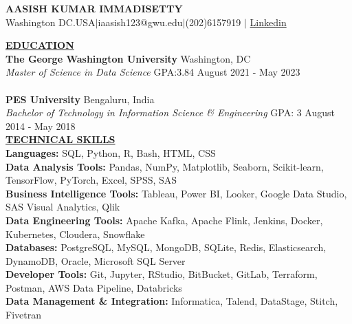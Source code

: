 \documentclass{article}
\begin{document}
\begin{center}
\thispagestyle{empty}
\large \textbf{AASISH KUMAR IMMADISETTY \\}
\normalsize Washington DC.USA$\mid$iaasish123@gwu.edu$\mid$(202)6157919 $\mid$ \href{https://www.linkedin.com/in/aasish-kumar-i-944384167/}{Linkedin}   \\
\hrulefill
\end{center}

\noindent \textbf{\underline{EDUCATION}} \\
\textbf{The George Washington University} \hfill Washington, DC \\
\textit{Master of Science in Data Science}  GPA:3.84 \hfill August 2021 - May 2023 \\ \\
\textbf{PES University} \hfill Bengaluru, India \\
\textit{Bachelor of Technology in Information Science \& Engineering}  GPA: 3 \hfill August 2014 - May 2018 \\


\noindent \textbf{\underline{TECHNICAL SKILLS}} \\
\textbf{Languages:} SQL, Python, R, Bash, HTML, CSS \\
\textbf{Data Analysis Tools:} Pandas, NumPy, Matplotlib, Seaborn, Scikit-learn, TensorFlow, PyTorch, Excel, SPSS, SAS \\
\textbf{Business Intelligence Tools:} Tableau, Power BI, Looker, Google Data Studio, SAS Visual Analytics, Qlik \\
\textbf{Data Engineering Tools:} Apache Kafka, Apache Flink, Jenkins, Docker, Kubernetes, Cloudera, Snowflake \\
\textbf{Databases:} PostgreSQL, MySQL, MongoDB, SQLite, Redis, Elasticsearch, DynamoDB, Oracle, Microsoft SQL Server \\
\textbf{Developer Tools:} Git, Jupyter, RStudio, BitBucket, GitLab, Terraform, Postman, AWS Data Pipeline, Databricks \\
\textbf{Data Management \& Integration:} Informatica, Talend, DataStage, Stitch, Fivetran\\
\end{document}
